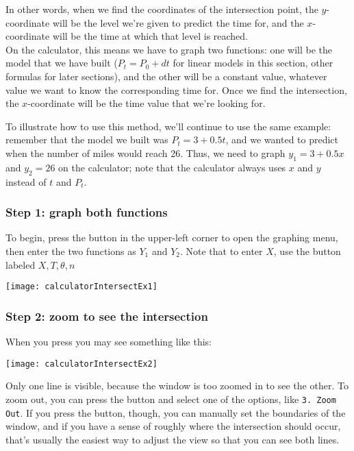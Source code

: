 In other words, when we find the coordinates of the intersection point, the $y$-coordinate will be the level we're given to predict the time for, and the $x$-coordinate will be the time at which that level is reached.\\

On the calculator, this means we have to graph two functions: one will be the model that we have built ($P_t = P_0 + dt$ for linear models in this section, other formulas for later sections), and the other will be a constant value, whatever value we want to know the corresponding time for.  Once we find the intersection, the $x$-coordinate will be the time value that we're looking for.

To illustrate how to use this method, we'll continue to use the same example: remember that the model we built was $P_t = 3 + 0.5t$, and we wanted to predict when the number of miles would reach 26.  Thus, we need to graph $y_1=3+0.5x$ and $y_2=26$ on the calculator; note that the calculator always uses $x$ and $y$ instead of $t$ and $P_t$.
\vfill
\pagebreak

\subsubsection*{Step 1: graph both functions}
To begin, press the  button in the upper-left corner to open the graphing menu, then enter the two functions as $Y_1$ and $Y_2$.  Note that to enter $X$, use the button labeled $\boxed{X, T, \theta, n}$
\begin{center}
\texttt{[image: calculatorIntersectEx1]}
\end{center}

\subsubsection*{Step 2: zoom to see the intersection}
When you press  you may see something like this:
\begin{center}
\texttt{[image: calculatorIntersectEx2]}
\end{center}

Only one line is visible, because the window is too zoomed in to see the other.  To zoom out, you can press the  button and select one of the options, like \texttt{3. Zoom Out}.  If you press the  button, though, you can manually set the boundaries of the window, and if you have a sense of roughly where the intersection should occur, that's usually the easiest way to adjust the view so that you can see both lines.

